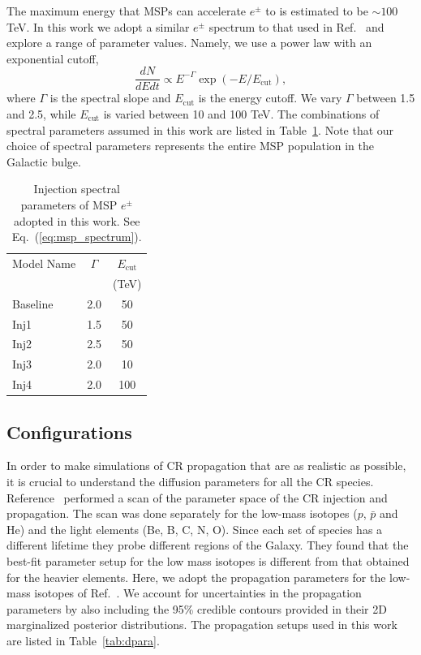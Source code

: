 \documentclass[doublespace,draft,nopageskip]{VTthesis} %
\begin{document}
The maximum energy that MSPs can accelerate $e^{\pm}$ to is estimated to be $\sim 100$ TeV. In this work we adopt a similar $e^\pm$ spectrum to that used in Ref.~\cite{Yuan:2014yda} and explore a range of parameter values. Namely, we use a power law with an exponential cutoff,
\begin{equation}
  \label{eq:msp_spectrum}
  \dfrac{dN}{dEdt} \propto E^{-\Gamma}\exp(-E/E_{\text{cut}}),
\end{equation}
where $\Gamma$ is the spectral slope and $E_{\text{cut}}$ is the energy cutoff. We vary $\Gamma$ between 1.5 and 2.5, while $E_{\text{cut}}$ is varied between 10 and 100 TeV. The combinations of spectral parameters assumed in this work are listed in Table~\ref{tab:msp_spectrum}. Note that our choice of spectral parameters represents the entire MSP population in the Galactic bulge.
\begin{table}[t!]
  \centering
  \caption{Injection spectral parameters of MSP $e^{\pm}$ adopted in this work. See Eq.~(\ref{eq:msp_spectrum}).}
    \begin{tabular}{lcc}\hline\hline
    Model Name&$\Gamma$ & $E_{\text{cut}}$\\
    & &  (TeV) \\\hline
    Baseline &2.0 & 50 \\
    Inj1&1.5 & 50 \\
    Inj2&2.5 & 50 \\
    Inj3&2.0 & 10 \\
    Inj4&2.0 & 100\\\hline\hline
    \end{tabular}
  \label{tab:msp_spectrum}
\end{table}

\subsection{Configurations}

In order to make simulations of CR propagation that are as realistic as possible, it is crucial to understand the diffusion parameters for all the CR species. Reference~\cite{Johannesson:2016rlh} performed a scan of the parameter space of the CR injection and propagation. The scan was done separately for the low-mass isotopes ($p$, $\bar{p}$ and He) and the light elements (Be, B, C, N, O). Since each set of species has a different lifetime they probe different regions of the Galaxy. They found that the best-fit parameter setup for the low mass isotopes is different from that obtained for the heavier elements. Here, we adopt the propagation parameters for the low-mass isotopes of Ref.~\cite{Johannesson:2016rlh}. We account for uncertainties in the propagation parameters by also including the 95\% credible contours provided in their 2D marginalized posterior distributions. The propagation setups used in this work are listed in Table~\ref{tab:dpara}.
\end{document}
